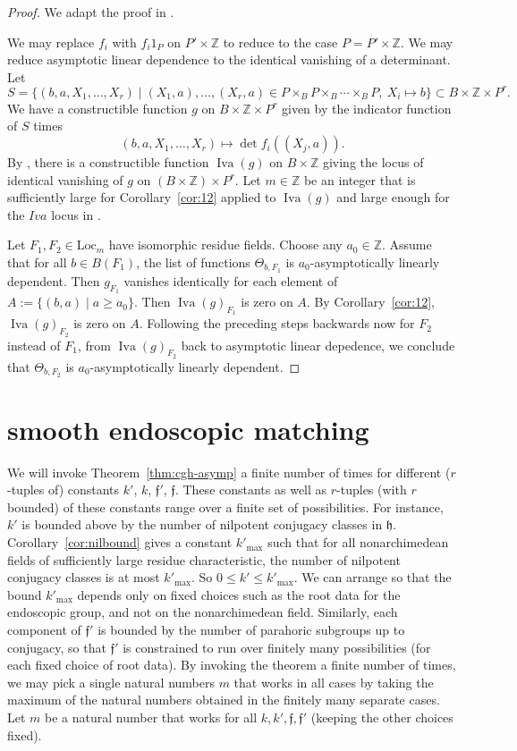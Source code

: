 \documentclass[12pt]{amsart}
\newcommand{\op}[1]{\operatorname{#1}}
\newcommand{\ring}[1]{{\mathbb #1}}
\newcommand{\locus}[1]{\op{Iva}(#1)}
\def\s{{\mathfrak{f}}}
\newcommand{\fh}{\mathfrak{h}}
\newcommand{\Loc}{\mathrm{Loc}}
\theoremstyle{plain}
\theoremstyle{definition}
\begin{document}
\begin{proof} We adapt the proof in \cite{CGH2}.

We may replace $f_i$ with $f_i 1_P$ on $P'\times\ring{Z}$ to reduce
to the case $P=P'\times\ring{Z}$.  We may reduce asymptotic linear
dependence to the identical vanishing of a determinant.
Let 
\[
S = \{(b,a,X_1,\ldots,X_r)\mid (X_1,a),\ldots,(X_r,a)\in P\times_B
P\times_B\cdots\times_B P,~X_i\mapsto b\} \subset B\times\ring{Z}\times P^r.
\]
We have a constructible function $g$ on $B\times\ring{Z}\times P^r$
given by the indicator function of $S$ times
\[
(b,a,X_1,\ldots,X_r)\mapsto 
\det f_i((X_j,a)).
\]
By \cite{CGH1}, there is a constructible function $\locus{g}$ on
$B\times\ring{Z}$ giving the locus of identical vanishing of $g$ on
$(B\times\ring{Z})\times P^r$.
Let $m\in\ring{Z}$ be an integer that is sufficiently large for
Corollary~\ref{cor:12} applied to $\locus{g}$ and large enough for the
$Iva$ locus in \cite{CGH1}.

Let $F_1,F_2\in\Loc_m$ have isomorphic residue fields.  Choose any
$a_0\in\ring{Z}$.  Assume that for all $b\in B(F_1)$, the list of
functions $\Theta_{b,F_1}$ is $a_0$-asymptotically linearly dependent.
Then $g_{F_1}$ vanishes identically for each element of $A:=\{(b,a)\mid
a\ge a_0\}$.  Then $\locus{g}_{F_1}$ is zero on $A$.  By
Corollary~\ref{cor:12}, $\locus{g}_{F_2}$ is zero on $A$.  Following
the preceding steps backwards now for $F_2$ instead of $F_1$, from
$\locus{g}_{F_2}$ back to asymptotic linear depedence, we conclude that
$\Theta_{b,F_2}$ is $a_0$-asymptotically linearly dependent.
\end{proof}



\section{smooth endoscopic matching}


We will invoke Theorem~\ref{thm:cgh-asymp} a finite number of times for different
($r$-tuples of) constants $k'$, $k$, $\s'$, $\s$.  These constants as
well as $r$-tuples (with $r$ bounded) of these constants range over a
finite set of possibilities.  For instance, $k'$ is bounded above by
the number of nilpotent conjugacy classes in $\fh$.  Corollary~\ref{cor:nilbound}
gives a
constant $k'_{\op{max}}$ such that for all nonarchimedean fields of
sufficiently large residue characteristic, the number of nilpotent
conjugacy classes is at most $k'_{\op{max}}$.  So $0\le k'\le
k'_{\op{max}}$.  We can arrange so that the bound $k'_{\op{max}}$
depends only on fixed choices such as the root data for the endoscopic
group, and not on the nonarchimedean field.  Similarly, each component
of $\s'$ is bounded by the number of parahoric subgroups up to
conjugacy, so that $\s'$ is constrained to run over finitely many
possibilities (for each fixed choice of root data). By invoking the
theorem a finite number of times, we may pick a single natural numbers
$m$ that works in all cases by taking the maximum of the natural
numbers obtained in the finitely many separate cases.  Let $m$ be a
natural number that works for all $k,k',\s,\s'$ (keeping the other
choices fixed).
\end{document}
